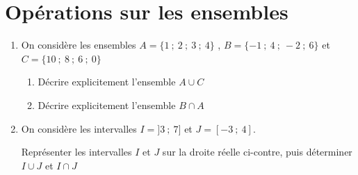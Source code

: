 \documentclass[oneside,12pt]{exam}          %
\begin{document}
\section{Opérations sur les ensembles}
\begin{enumerate}[itemsep = 2mm]
	\item On considère les ensembles $A = \{ 1 ~;~ 2 ~;~ 3  ~;~ 4 \}$ , $B = \{ -1 ~;~ 4 ~;~ -2 ~;~ 6\}$ et $C = \{ 10 ~;~ 8 ~;~ 6 ~;~ 0\}$
	\begin{enumerate}
		\item Décrire explicitement l'ensemble $A \cup C$
		\item Décrire explicitement l'ensemble $B \cap A$
	\end{enumerate}
	
	\item On considère les intervalles $I = ]3 ~;~ 7]$ et $J = [-3 ~;~ 4]$.
	
	Représenter les intervalles $I$ et $J$ sur la droite réelle ci-contre, puis déterminer $I \cup J$ et $I \cap J$
	
	\vspace*{5mm}
	
	\begin{center}
	\end{center}
\end{enumerate}



\newpage
{}
\end{document}
